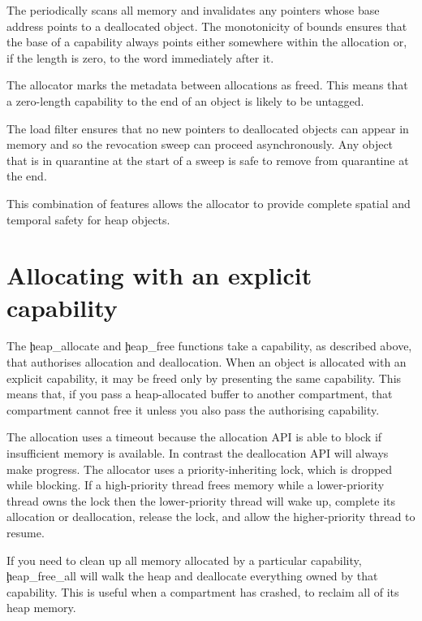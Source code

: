 The  periodically scans all memory and invalidates any pointers whose base address points to a deallocated object.
The monotonicity of bounds ensures that the base of a capability always points either somewhere within the allocation or, if the length is zero, to the word immediately after it.

\begin{note}
The allocator marks the metadata between allocations as freed.
This means that a zero-length capability to the end of an object is likely to be untagged.
\end{note}

The load filter ensures that no new pointers to deallocated objects can appear in memory and so the revocation sweep can proceed asynchronously.
Any object that is in quarantine at the start of a sweep is safe to remove from quarantine at the end.

This combination of features allows the allocator to provide complete spatial and temporal safety for heap objects.

\section{Allocating with an explicit capability}



The \c{heap_allocate} and \c{heap_free} functions take a capability, as described above, that authorises allocation and deallocation.
When an object is allocated with an explicit capability, it may be freed only by presenting the same capability.
This means that, if you pass a heap-allocated buffer to another compartment, that compartment cannot free it unless you also pass the authorising capability.

\begin{note}
	The allocation uses a timeout because the allocation API is able to block if insufficient memory is available.
	In contrast the deallocation API will always make progress.
	The allocator uses a priority-inheriting lock, which is dropped while blocking.
	If a high-priority thread frees memory while a lower-priority thread owns the lock then the lower-priority thread will wake up, complete its allocation or deallocation, release the lock, and allow the higher-priority thread to resume.
\end{note}

If you need to clean up all memory allocated by a particular capability, \c{heap_free_all} will walk the heap and deallocate everything owned by that capability.
This is useful when a compartment has crashed, to reclaim all of its heap memory.

